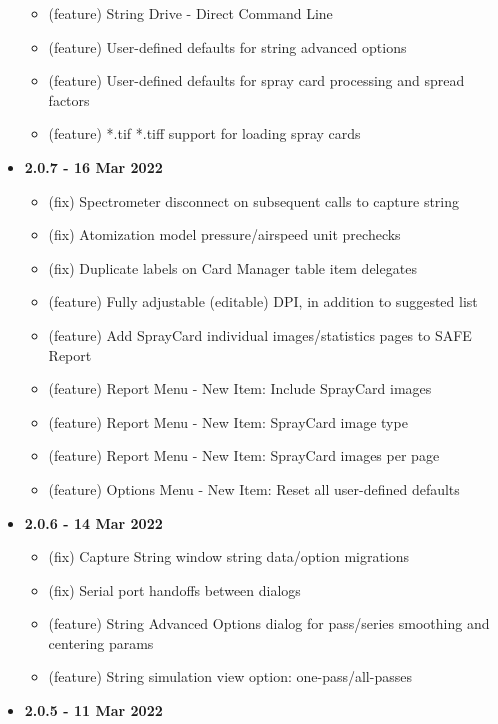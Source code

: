\documentclass[10pt,letterpaper,titlepage]{article}
\begin{document}
\begin{itemize}
\begin{itemize}
            \item (feature) String Drive - Direct Command Line
            \item (feature) User-defined defaults for string advanced options
            \item (feature) User-defined defaults for spray card processing and spread factors
            \item (feature) *.tif *.tiff support for loading spray cards
        \end{itemize}
        \item \textbf{2.0.7 - 16 Mar 2022}
        \begin{itemize}
            \item (fix) Spectrometer disconnect on subsequent calls to capture string
            \item (fix) Atomization model pressure/airspeed unit prechecks
            \item (fix) Duplicate labels on Card Manager table item delegates
            \item (feature) Fully adjustable (editable) DPI, in addition to suggested list
            \item (feature) Add SprayCard individual images/statistics pages to SAFE Report
            \item (feature) Report Menu - New Item: Include SprayCard images
            \item (feature) Report Menu - New Item: SprayCard image type
            \item (feature) Report Menu - New Item: SprayCard images per page
            \item (feature) Options Menu - New Item: Reset all user-defined defaults
        \end{itemize}
        \item \textbf{2.0.6 - 14 Mar 2022}
        \begin{itemize}
            \item (fix) Capture String window string data/option migrations
            \item (fix) Serial port handoffs between dialogs
            \item (feature) String Advanced Options dialog for pass/series smoothing and centering params
            \item (feature) String simulation view option: one-pass/all-passes
        \end{itemize}
        \item \textbf{2.0.5 - 11 Mar 2022}

\end{itemize}
\end{document}
